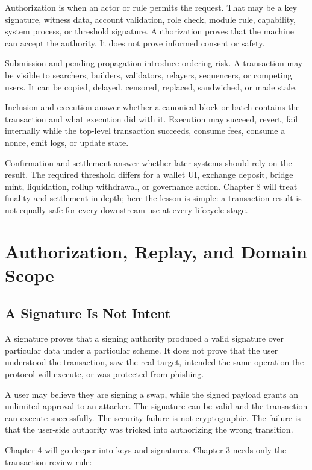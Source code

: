 Authorization is when an actor or rule permits the request. That may be a key signature, witness data, account validation, role check, module rule, capability, system process, or threshold signature. Authorization proves that the machine can accept the authority. It does not prove informed consent or safety.

Submission and pending propagation introduce ordering risk. A transaction may be visible to searchers, builders, validators, relayers, sequencers, or competing users. It can be copied, delayed, censored, replaced, sandwiched, or made stale.

Inclusion and execution answer whether a canonical block or batch contains the transaction and what execution did with it. Execution may succeed, revert, fail internally while the top-level transaction succeeds, consume fees, consume a nonce, emit logs, or update state.

Confirmation and settlement answer whether later systems should rely on the result. The required threshold differs for a wallet UI, exchange deposit, bridge mint, liquidation, rollup withdrawal, or governance action. Chapter 8 will treat finality and settlement in depth; here the lesson is simple: a transaction result is not equally safe for every downstream use at every lifecycle stage.

\section{Authorization, Replay, and Domain Scope}

\subsection{A Signature Is Not Intent}

A signature proves that a signing authority produced a valid signature over particular data under a particular scheme. It does not prove that the user understood the transaction, saw the real target, intended the same operation the protocol will execute, or was protected from phishing.

A user may believe they are signing a swap, while the signed payload grants an unlimited approval to an attacker. The signature can be valid and the transaction can execute successfully. The security failure is not cryptographic. The failure is that the user-side authority was tricked into authorizing the wrong transition.

Chapter 4 will go deeper into keys and signatures. Chapter 3 needs only the transaction-review rule:

